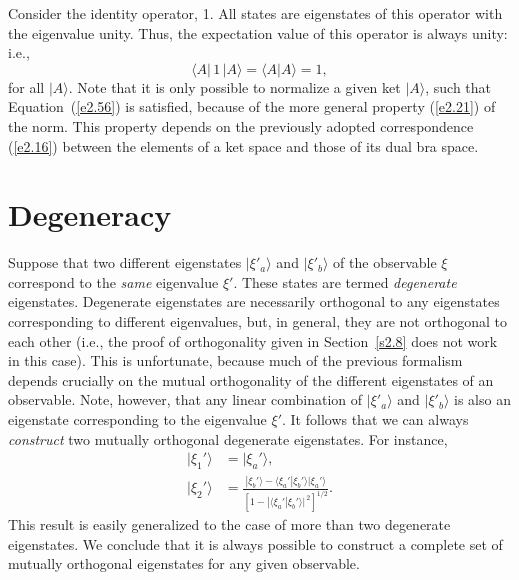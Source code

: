 Consider the identity operator, 1. All states are eigenstates of this operator
with the eigenvalue unity. Thus, the expectation value of this operator
is always unity: {\rm i.e.},
\begin{equation}\label{e2.56}
\langle A|\,1\,|A\rangle = \langle A|A\rangle =1,
\end{equation}
for all $|A\rangle$. Note that it is only possible to normalize a given
ket $|A\rangle$, such that Equation~(\ref{e2.56}) is satisfied, because of the more general
property (\ref{e2.21}) of the norm. This property depends on the previously adopted correspondence
(\ref{e2.16}) between the elements of a ket space and those of its
dual bra space. 

\section{Degeneracy}
Suppose that two different eigenstates $|\xi'_a\rangle$ and $|\xi'_b\rangle$ 
of the observable $\xi$ 
correspond to the {\em same}\/ eigenvalue $\xi'$. These states are termed {\em degenerate}\/ 
eigenstates. Degenerate eigenstates are 
necessarily orthogonal to any eigenstates corresponding to
different eigenvalues, but, in general, they are not orthogonal to each other
({\rm i.e.}, the proof of orthogonality given in Section~\ref{s2.8} does not work in this case).
This is unfortunate, because  much of the previous formalism depends crucially
on the mutual orthogonality of the different eigenstates
of an observable. Note, however, that
any linear combination of $|\xi'_a\rangle$ and $|\xi'_b\rangle$ is also
an eigenstate corresponding to the eigenvalue $\xi'$. It follows that we
can always {\em construct}\/ two mutually orthogonal degenerate eigenstates.
For instance,
\begin{align}
|\xi_1'\rangle &= |\xi_a'\rangle,\\[0.5ex]
|\xi_2'\rangle&=\frac{ |\xi_b'\rangle - \langle \xi_a'|\xi_b'\rangle
|\xi_a'\rangle}{[1-|\langle \xi_a'|\xi_b'\rangle|^{\,2}]^{1/2}}.
\end{align}
This result is easily generalized to the case of more than two degenerate eigenstates.
We conclude that it is always possible to construct a complete set of mutually
orthogonal eigenstates for any given observable.

